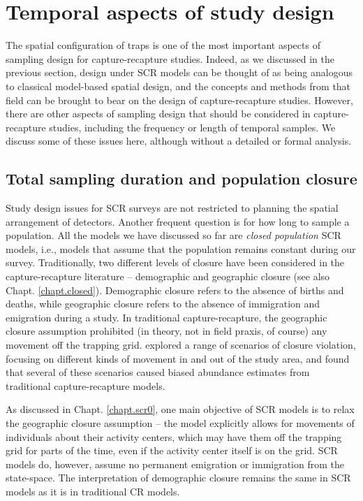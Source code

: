 \section{Temporal aspects of study design}

The spatial configuration of traps is one of the most important
aspects of sampling design for capture-recapture studies. Indeed, as
we discussed in the previous section, design under SCR models can be
thought of as being analogous to classical model-based spatial design,
and the concepts and methods from that field can be brought to bear on
the design of capture-recapture studies.
However, there are other aspects of sampling design that should be
considered in capture-recapture studies, including the frequency or
length of temporal samples. We discuss some of these issues here,
although without a detailed or formal analysis.

\subsection{Total sampling duration and population closure}

Study design issues for SCR surveys are not restricted to planning the
spatial arrangement of detectors. Another frequent question is for how
long to sample a population. All the models we have discussed so far
are {\it closed population} SCR models, i.e., models that assume
that the population remains constant during our survey. Traditionally,
two different levels of closure have been considered in the
capture-recapture literature -- demographic and geographic closure
(see also Chapt. \ref{chapt.closed}). Demographic closure refers to
the absence of births and deaths, while geographic closure refers to
the absence of immigration and emigration during a study. In
traditional capture-recapture, the geographic closure assumption
prohibited (in theory, not in field praxis, of course) any movement
off the trapping grid.  \citet{kendall:1999} explored a range of
scenarios of closure violation, focusing on different kinds of
movement in and out of the study area, and found that several of these
scenarios caused biased abundance estimates from traditional
capture-recapture models.


As discussed in Chapt. \ref{chapt.scr0}, one main objective of SCR
models is to relax the geographic closure assumption -- the model
explicitly allows for movements of individuals about their activity
centers, which may have them off the trapping grid for parts of the
time, even if the activity center itself is on the grid. SCR models
do, however, assume no permanent emigration or immigration from the
state-space. The interpretation of demographic closure remains the
same in SCR models as it is in traditional CR models.

